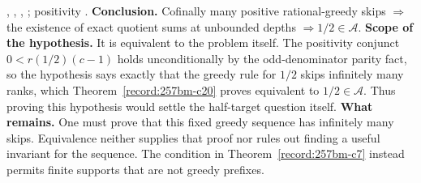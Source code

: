 \begin{obs}
,
,
,
; positivity
.
\textbf{Conclusion.} Cofinally many positive rational-greedy skips $\Rightarrow$
the existence of exact quotient sums at unbounded depths $\Rightarrow 1/2 \in
\ensuremath{\mathcal A}$.
\textbf{Scope of the hypothesis.} It is equivalent to the problem itself. The positivity
conjunct $0 < \ensuremath{r}(1/2)(c{-}1)$ holds unconditionally by the odd-denominator parity
fact, so the hypothesis says exactly that the greedy rule for $1/2$ skips infinitely many
ranks, which Theorem~\ref{record:257bm-c20} proves equivalent to
$1/2\in\mathcal A$.  Thus proving this hypothesis would settle the half-target
question itself.
\textbf{What remains.} One must prove that this fixed greedy sequence has
infinitely many skips.  Equivalence neither supplies that proof nor rules
out finding a useful invariant for the sequence.  The condition in
Theorem~\ref{record:257bm-c7} instead permits finite supports that are
not greedy prefixes.
\end{obs}

